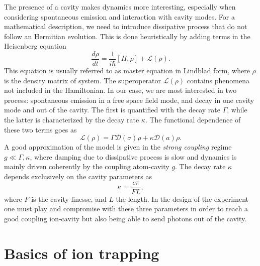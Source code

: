 The presence of a cavity makes dynamics more interesting, especially when considering spontaneous emission and interaction with cavity modes. For a mathematical description, we need to introduce dissipative process that do not follow an Hermitian evolution. This is done heuristically by adding terms in the Heisenberg equation
\begin{equation}
\label{masterequation}
\frac{d\rho}{dt} = \frac{1}{i\hbar}[H,\rho] + \mathcal{L}(\rho).
\end{equation}
This equation is usually referred to as master equation in Lindblad form, where $\rho$ is the density matrix of system. The superoperator
$\mathcal{L}(\rho)$ contains phenomena not included in the Hamiltonian. In our case, we are most interested in two process: spontaneous emission in a free space field mode, and decay in one cavity mode and out of the cavity. The first is quantified with the decay rate $\Gamma$, while the latter is characterized by the decay rate $\kappa$. The functional dependence of these two terms goes as \cite{steck}
\begin{equation}
\mathcal{L}(\rho) = \Gamma\mathcal{D}(\sigma)\rho + \kappa \mathcal{D}(a)\rho.
\end{equation}
A good approximation of the model is given in the \emph{strong coupling} regime $g\ll \Gamma,\kappa$, where damping due to dissipative process is slow and dynamics is mainly driven coherently by the coupling atom-cavity $g$. The decay rate $\kappa$ depends exclusively on the cavity parameters as \cite{helene}
\begin{equation}
\kappa =\frac{c\pi}{FL},
\end{equation}
where $F$ is the cavity finesse, and $L$ the length. In the design of the experiment one must play and compromise with these three parameters in order to reach a good coupling ion-cavity but also being able to send photons out of the cavity.

\section{Basics of ion trapping}
